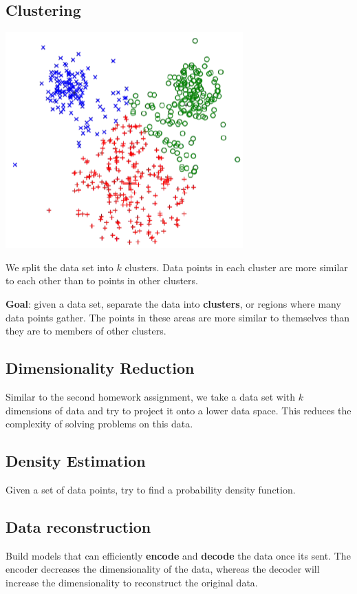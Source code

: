 \documentclass{tufte-handout}
\begin{document}
	\subsection{Clustering}
		\begin{marginfigure}
			\includegraphics[scale=0.4]{kmeans.png}
			\caption{We split the data set into $k$ clusters. 
				Data points in each cluster	are more similar to each other than to points in other clusters.
			}			
		\end{marginfigure}

		\textbf{Goal}: given a data set, separate the data into \textbf{clusters}, or regions 
		where many data points gather. 
		The points in these areas are more similar to themselves than they are to members
		of other clusters.

	\subsection{Dimensionality Reduction}
		Similar to the second homework assignment, we take a data set with $k$ dimensions of data and try 
		to project it onto a lower data space. 
		This reduces the complexity of solving problems on this data.

	\subsection{Density Estimation}
		Given a set of data points, try to find a probability density function.

	\subsection{Data reconstruction}
		Build models that can efficiently \textbf{encode} and \textbf{decode} the data once its sent.
		The encoder decreases the dimensionality of the data, whereas the decoder will increase the 
		dimensionality to reconstruct the original data.
\end{document}
